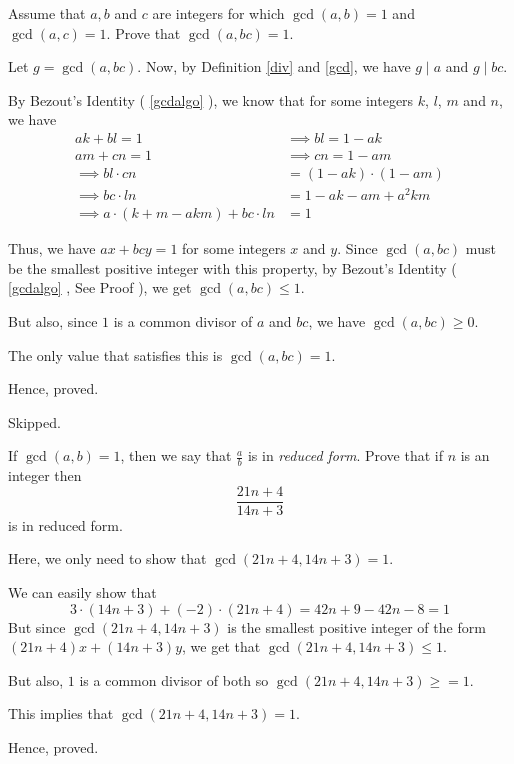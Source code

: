 \begin{problem}
	Assume that $a, b$ and $c$ are integers for which $\gcd(a, b) = 1$ and $\gcd(a, c) = 1$. Prove that $\gcd(a, bc) = 1$.
\end{problem}

\begin{solution}
	Let $g = \gcd(a, bc)$. Now, by Definition \ref{div} and \ref{gcd}, we have $g \mid a$ and $g \mid bc$.

	By Bezout's Identity ( \ref{gcdalgo} ), we know that for some integers $k$, $l$, $m$ and $n$, we have 
	\begin{align}
		ak + bl = 1 &\implies bl = 1 - ak \\
		am + cn = 1 &\implies cn = 1 - am \\
		\implies bl \cdot cn &= (1-ak) \cdot (1-am) \\
		\implies bc \cdot ln &= 1 - ak - am +a^2 km \\
		\implies a \cdot(k + m - akm) + bc \cdot ln &= 1
\end{align}
	
Thus, we have $ax + bcy = 1$ for some integers $x$ and $y$.
Since $\gcd(a, bc)$ must be the smallest positive integer with this property, by Bezout's Identity ( \ref{gcdalgo} , See Proof ), we get $\gcd(a, bc) \leq 1$. 

But also, since $1$ is a common divisor of $a$ and $bc$, we have $\gcd(a, bc) \geq 0$.

The only value that satisfies this is $\gcd(a, bc) = 1$.

Hence, proved.
\end{solution}


\begin{problem}Skipped.\end{problem}

\begin{problem}
	If $\gcd(a, b) = 1$, then we say that $\frac{a}{b}$ is in \emph{reduced form}. Prove that if $n$ is an integer then $$\frac{21n+4}{14n+3}$$ is in reduced form.
\end{problem}

\begin{solution}
	Here, we only need to show that $\gcd(21n+4, 14n+3) = 1$.

	We can easily show that 
	$$3 \cdot (14n+3) + (-2) \cdot (21n+4) = 42n + 9 - 42n - 8 = 1$$
	But since $\gcd(21n+4, 14n+3)$ is the smallest positive integer of the form $(21n+4)x + (14n+3)y$, we get that $\gcd(21n+4, 14n+3) \leq 1$.

	But also, $1$ is a common divisor of both so $\gcd(21n+4, 14n+3) \geq = 1$.
	
	This implies that $\gcd(21n+4, 14n+3) = 1$.

	Hence, proved.
\end{solution}



